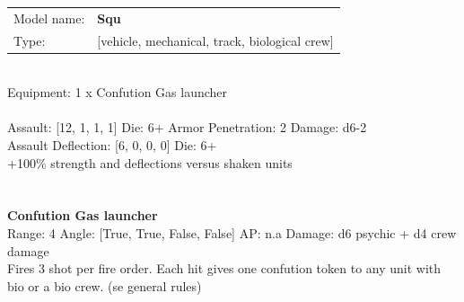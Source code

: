 \begin{tabular}{ll}
Model name: & {\bf Squ } \\
Type: & [vehicle, mechanical, track, biological crew] \\
\end{tabular}
\ \\
Equipment: 1 x Confution Gas launcher \\
\ \\
Assault: [12, 1, 1, 1] Die: 6+ Armor Penetration: 2 Damage: d6-2 \\
Assault Deflection: [6, 0, 0, 0] Die: 6+\\
\indent +100\% strength and deflections versus shaken units\\ 
 
\ \\

\ \\
{\bf Confution Gas launcher } \\



Range: 4  Angle: [True, True, False, False] AP: n.a Damage: d6 psychic + d4 crew damage \\
Fires 3 shot per fire order. Each hit gives one confution token to any unit with bio or a bio crew. (se general rules)\\ 




 
\ \\














